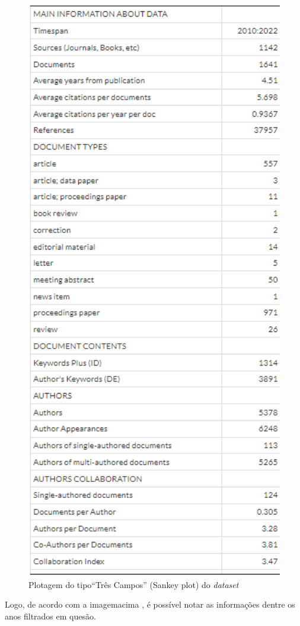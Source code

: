 \begin{figure}
    \centering
    \includegraphics[width=1\textwidth]{experiments/vitorararuna/ult.png}
    \caption{Plotagem do tipo``Três Campos'' (Sankey plot) do \textit{dataset}}
    \label{fig:DEEPFAKES@vitorararuna:ult}
\end{figure}

Logo, de acordo com a imagemacima , é possível notar as informações dentre os anos filtrados em quesão.